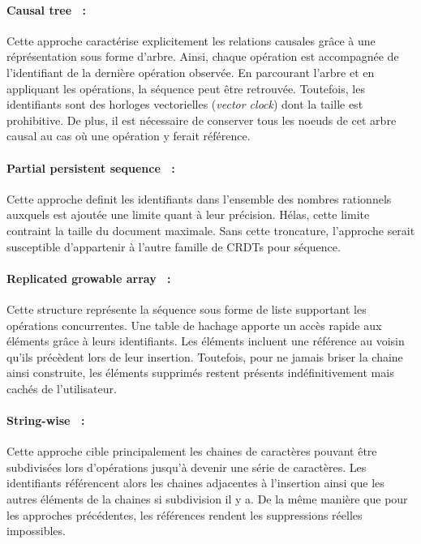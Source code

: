 \paragraph{Causal tree~\cite{grishchenko2010deep} :} Cette approche caractérise
explicitement les relations causales grâce à une réprésentation sous forme
d'arbre. Ainsi, chaque opération est accompagnée de l'identifiant de la dernière
opération observée. En parcourant l'arbre et en appliquant les opérations, la
séquence peut être retrouvée. Toutefois, les identifiants sont des horloges
vectorielles (\emph{vector clock}) dont la taille est prohibitive. De plus, il
est nécessaire de conserver tous les noeuds de cet arbre causal au cas où une
opération y ferait référence.

\paragraph{Partial persistent sequence~\cite{wu2010partial} :} Cette approche
definit les identifiants dans l'ensemble des nombres rationnels auxquels est
ajoutée une limite quant à leur précision. Hélas, cette limite contraint la
taille du document maximale. Sans cette troncature, l'approche serait
susceptible d'appartenir à l'autre famille de CRDTs pour séquence.

\paragraph{Replicated growable array~\cite{roh2011replicated} :} Cette structure
représente la séquence sous forme de liste supportant les opérations
concurrentes. Une table de hachage apporte un accès rapide aux éléments grâce à
leurs identifiants. Les éléments incluent une référence au voisin qu'ils
précèdent lors de leur insertion. Toutefois, pour ne jamais briser la chaine
ainsi construite, les éléments supprimés restent présents indéfinitivement mais
cachés de l'utilisateur.

\paragraph{String-wise~\cite{yu2012stringwise} :} Cette approche cible
principalement les chaines de caractères pouvant être subdivisées lors
d'opérations jusqu'à devenir une série de caractères. Les identifiants
référencent alors les chaines adjacentes à l'insertion ainsi que les autres
éléments de la chaines si subdivision il y a. De la même manière que pour les
approches précédentes, les références rendent les suppressions réelles
impossibles.

